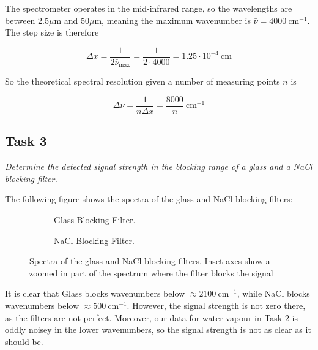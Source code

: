 \documentclass{article}
\begin{document}
The spectrometer operates in the mid-infrared range, so the wavelengths are between $2.5 \mu \text{m}$ and $50  \mu \text{m}$, meaning the maximum wavenumber is $\bar{\nu} = 4000 \ \text{cm}^{-1}$. The step size is therefore

\begin{equation*}
	\Delta x = \frac{1}{2 \bar{\nu}_{\max}} = \frac{1}{2 \cdot 4000} = \boxed{1.25 \cdot 10^{-4} \ \text{cm}}
\end{equation*}

So the theoretical spectral resolution given a number of measuring points $n$ is

\begin{equation*}
	\Delta \nu = \frac{1}{n \Delta x} = \boxed{\frac{8000}{n} \ \text{cm}^{-1}}
\end{equation*}

\pagebreak{}

\subsection{Task 3}

\textit{Determine the detected signal strength in the blocking range of a glass and a NaCl blocking filter.}

The following figure shows the spectra of the glass and NaCl blocking filters:

\begin{figure}[h!]
	\centering
	\begin{subfigure}[t]{0.48\textwidth}
		\centering
		\scalebox{0.5}{}
		\caption{Glass Blocking Filter.}
		\label{fig:glass}
	\end{subfigure} \hfill
	\begin{subfigure}[t]{0.48\textwidth}
		\centering
		\scalebox{0.5}{}
		\caption{NaCl Blocking Filter.}
		\label{fig:nacl}
	\end{subfigure}
	\caption{Spectra of the glass and NaCl blocking filters. Inset axes show a zoomed in part of the spectrum where the filter blocks the signal}
	\label{fig:glass_nacl}
\end{figure}

It is clear that Glass blocks wavenumbers below $\approx 2100 \ \text{cm}^{-1}$, while NaCl blocks wavenumbers below $\approx 500 \ \text{cm}^{-1}$. However, the signal strength is not zero there, as the filters are not perfect.
Moreover, our data for water vapour in Task 2 is oddly noisey in the lower wavenumbers, so the signal strength is not as clear as it should be.  
\end{document}

